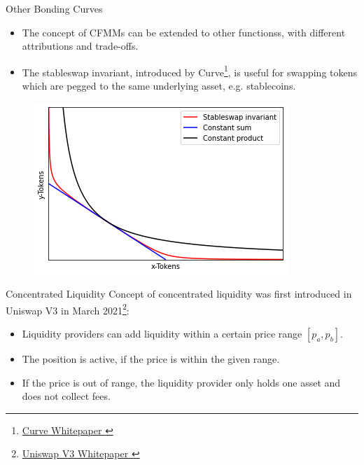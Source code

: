 \documentclass[]{beamer}
\begin{document}
\begin{frame}{Other Bonding Curves}

\begin{small}
\begin{itemize}
	\item The concept of CFMMs can be extended to other functionss, with different attributions and trade-offs. 
	\item The stableswap invariant, introduced by Curve\footnote{\href{https://curve.fi/files/stableswap-paper.pdf}{Curve Whitepaper \link}}, is useful for swapping tokens which are pegged to the same underlying asset, e.g. stablecoins.
	\end{itemize}
\end{small}

	\begin{figure}
		\includegraphics[scale=0.6]{../assets/images/bonding-curves.png}
	\end{figure}
	
\end{frame}


\begin{frame}{Concentrated Liquidity}
	Concept of concentrated liquidity was first introduced in Uniswap V3 in March 2021\footnote{\href{https://uniswap.org/whitepaper-v3.pdf}{Uniswap V3 Whitepaper \link}}:
	\begin{itemize}
		\item<2-> Liquidity providers can add liquidity within a certain price range $[p_a, p_b]$.
		\item<3-> The position is active, if the price is within the given range. %
		\item<4-> If the price is out of range, the liquidity provider only holds one asset and does not collect fees.
	\end{itemize}
	\vspace{0.5cm}
\end{frame}
\end{document}

